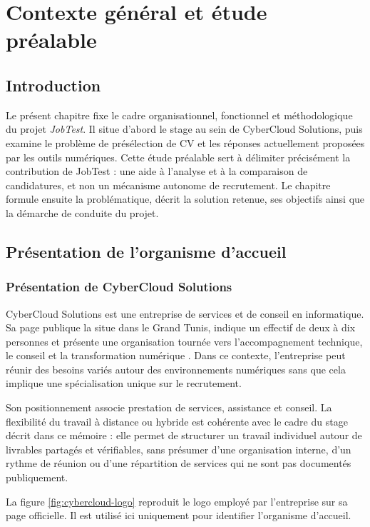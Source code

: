 \chapter{Contexte général et étude préalable}

\section*{Introduction}
Le présent chapitre fixe le cadre organisationnel, fonctionnel et méthodologique du projet \textit{JobTest}. Il situe d'abord le stage au sein de CyberCloud Solutions, puis examine le problème de présélection de CV et les réponses actuellement proposées par les outils numériques. Cette étude préalable sert à délimiter précisément la contribution de JobTest : une aide à l'analyse et à la comparaison de candidatures, et non un mécanisme autonome de recrutement. Le chapitre formule ensuite la problématique, décrit la solution retenue, ses objectifs ainsi que la démarche de conduite du projet.

\section{Présentation de l'organisme d'accueil}

\subsection{Présentation de CyberCloud Solutions}
CyberCloud Solutions est une entreprise de services et de conseil en informatique. Sa page publique la situe dans le Grand Tunis, indique un effectif de deux à dix personnes et présente une organisation tournée vers l'accompagnement technique, le conseil et la transformation numérique \cite{cybercloud_linkedin}. Dans ce contexte, l'entreprise peut réunir des besoins variés autour des environnements numériques sans que cela implique une spécialisation unique sur le recrutement.

Son positionnement associe prestation de services, assistance et conseil. La flexibilité du travail à distance ou hybride est cohérente avec le cadre du stage décrit dans ce mémoire : elle permet de structurer un travail individuel autour de livrables partagés et vérifiables, sans présumer d'une organisation interne, d'un rythme de réunion ou d'une répartition de services qui ne sont pas documentés publiquement.

La figure \ref{fig:cybercloud-logo} reproduit le logo employé par l'entreprise sur sa page officielle. Il est utilisé ici uniquement pour identifier l'organisme d'accueil.

